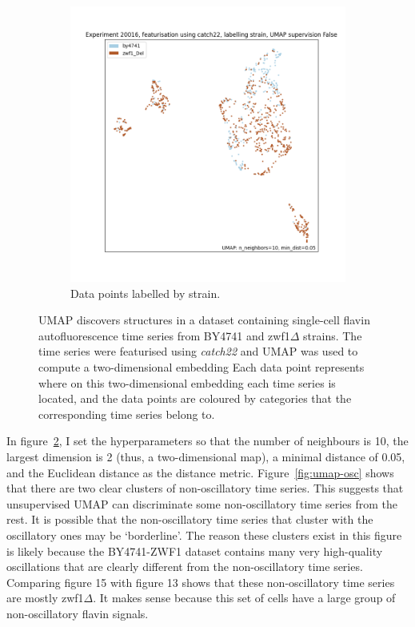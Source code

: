 \begin{figure}
  \begin{subfigure}[t]{0.7\textwidth}
  \centering
    \includegraphics[width=\linewidth]{Figure_13}
    \caption{
      Data points labelled by strain.
    }
    \label{fig:umap-strain}
  \end{subfigure}

  \caption{
    UMAP discovers structures in a dataset containing single-cell flavin autofluorescence time series from BY4741 and zwf1$\Delta$ strains.
    The time series were featurised using \textit{catch22} and UMAP was used to compute a two-dimensional embedding
    Each data point represents where on this two-dimensional embedding each time series is located, and the data points are coloured by categories that the corresponding time series belong to.
  }
  \label{fig:umap}
\end{figure}

In figure~\ref{fig:umap}, I set the hyperparameters so that the number of neighbours is 10, the largest dimension is 2 (thus, a two-dimensional map), a minimal distance of 0.05, and the Euclidean distance as the distance metric.
Figure~\ref{fig:umap-osc} shows that there are two clear clusters of non-oscillatory time series.
This suggests that unsupervised UMAP can discriminate some non-oscillatory time series from the rest.
It is possible that the non-oscillatory time series that cluster with the oscillatory ones may be `borderline'.
The reason these clusters exist in this figure is likely because the BY4741-ZWF1 dataset contains many very high-quality oscillations that are clearly different from the non-oscillatory time series.
Comparing figure 15 with figure 13 shows that these non-oscillatory time series are mostly zwf1$\Delta$.
It makes sense because this set of cells have a large group of non-oscillatory flavin signals.


